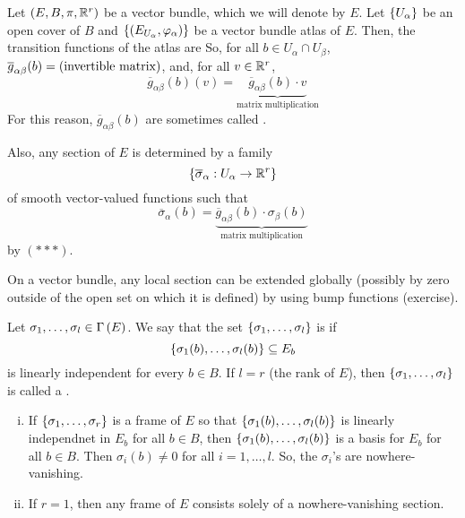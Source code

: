 \documentclass[main.tex]{subfiles}
\begin{document}
 Let $(E, B, \pi, \mathbb{R}^r)$ be a vector bundle, which we will denote by $E$. Let $\left\{U_\alpha\right\}$ be an open cover of $B$ and $\left\{ \left(  E_{U_\alpha}, \varphi_\alpha   \right)\right\}$ be a vector bundle atlas of $E$. Then, the transition functions of the atlas are
 So, for all $b \in U_\alpha \cap U_\beta$, $\overline{g}_{\alpha\beta}(b) = \left( \text{invertible matrix}  \right)$, and, for all $v \in \mathbb{R}^r$,
 \[
 \overline{g}_{\alpha\beta}(b)(v) = \underbrace{\overline{g}_{\alpha\beta}(b) \cdot v}_{\text{matrix multiplication}}
 \]
 For this reason, $\overline{g}_{\alpha\beta}(b)$ are sometimes called .

 Also, any section of $E$ is determined by a family \[
 \left\{\overline{\sigma}_\alpha : U_\alpha \to \mathbb{R}^r\right\}
 \]
 of smooth vector-valued functions such that
 \[
 \overline{\sigma}_\alpha(b) = \underbrace{\overline{g}_{\alpha\beta}(b) \cdot \sigma_\beta(b)}_{\text{matrix multiplication}}
 \] by $(***)$.

 \begin{note}
 On a vector bundle, any local section can be extended globally (possibly by zero outside of the open set on which it is defined) by using bump functions (exercise).
 \end{note}

 \begin{defn}
 Let $\sigma_1, \dots, \sigma_l \in \Gamma\left( E \right)$. We say that the set $\left\{\sigma_1, \dots, \sigma_l\right\}$ is  if
 \[
 \left\{\sigma_1(b), \dots, \sigma_l(b)\right\} \subseteq E_b
 \] is linearly independent for every $b \in B$. If $l = r$ (the rank of $E$), then $\left\{\sigma_1, \dots, \sigma_l\right\}$ is called a .
 \end{defn}

 \begin{note}
 \begin{enumerate}[(i)]
     \item If $\left\{\sigma_1, \dots, \sigma_r \right\}$ is a frame of $E$ so that $\left\{\sigma_1(b),\dots, \sigma_l(b)\right\}$ is linearly independnet in $E_b$ for all $b \in B$, then $\left\{ \sigma_1(b), \dots, \sigma_l(b) \right\}$ is a basis for $E_b$ for all $b \in B$. Then $\sigma_i(b)  \neq 0$ for all $i = 1, \dots, l$. So, the $\sigma_i$'s are nowhere-vanishing.
     \item If $r=1$, then any frame of $E$ consists solely of a nowhere-vanishing section.
 \end{enumerate}
 \end{note}
\end{document}
